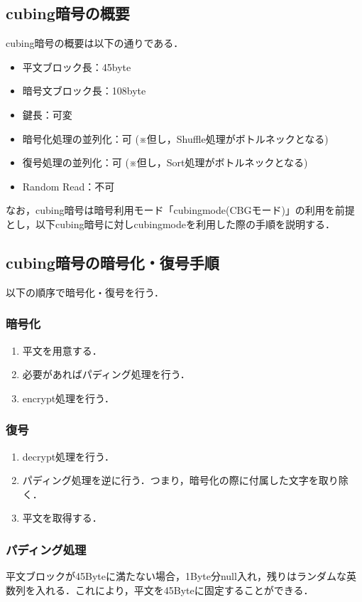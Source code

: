 \documentclass{jsarticle}
\begin{document}
\subsection{cubing暗号の概要}
cubing暗号の概要は以下の通りである．
\begin{itemize}
  \item 平文ブロック長：45byte
  \item 暗号文ブロック長：108byte
  \item 鍵長：可変
  \item 暗号化処理の並列化：可 (※但し，Shuffle処理がボトルネックとなる)
  \item 復号処理の並列化：可 (※但し，Sort処理がボトルネックとなる)
  \item Random Read：不可
\end{itemize}
なお，cubing暗号は暗号利用モード「cubingmode(CBGモード)」の利用を前提とし，以下cubing暗号に対しcubingmodeを利用した際の手順を説明する．
\subsection{cubing暗号の暗号化・復号手順}

以下の順序で暗号化・復号を行う．

\subsubsection{暗号化}
\begin{enumerate}
\item 平文を用意する．
\item 必要があればパディング処理を行う．
\item encrypt処理を行う．
\end{enumerate}

\subsubsection{復号}
\begin{enumerate}
\item decrypt処理を行う．
\item パディング処理を逆に行う．つまり，暗号化の際に付属した文字を取り除く．
\item 平文を取得する．
\end{enumerate}

\subsubsection{パディング処理}
平文ブロックが45Byteに満たない場合，1Byte分null入れ，残りはランダムな英数列を入れる．これにより，平文を45Byteに固定することができる．
\end{document}
